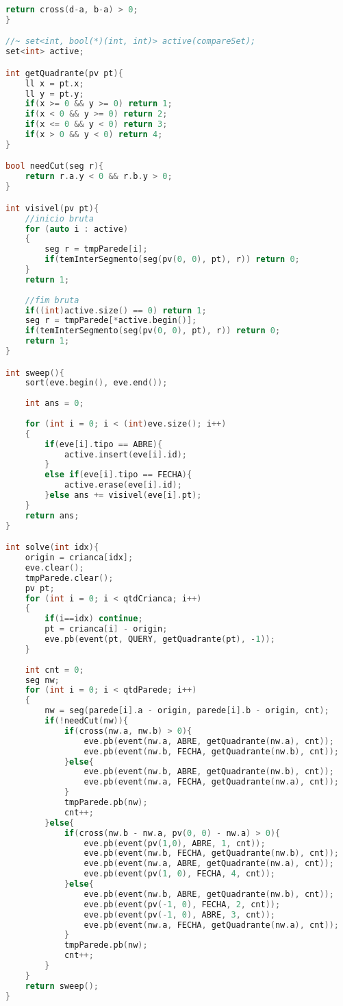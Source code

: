 \documentclass[12pt,a4paper, twoside]{report}
\begin{document}
\begin{lstlisting}[caption=Sweep Circle (esconde-esconde),language=C++]
    return cross(d-a, b-a) > 0;
}

//~ set<int, bool(*)(int, int)> active(compareSet);
set<int> active;

int getQuadrante(pv pt){
    ll x = pt.x;
    ll y = pt.y;
    if(x >= 0 && y >= 0) return 1;
    if(x < 0 && y >= 0) return 2;
    if(x <= 0 && y < 0) return 3;
    if(x > 0 && y < 0) return 4;
}

bool needCut(seg r){
    return r.a.y < 0 && r.b.y > 0;
}

int visivel(pv pt){
    //inicio bruta
    for (auto i : active)
    {
        seg r = tmpParede[i];
        if(temInterSegmento(seg(pv(0, 0), pt), r)) return 0;
    }
    return 1;
    
    //fim bruta
    if((int)active.size() == 0) return 1;
    seg r = tmpParede[*active.begin()];
    if(temInterSegmento(seg(pv(0, 0), pt), r)) return 0;
    return 1;
}

int sweep(){
    sort(eve.begin(), eve.end());
    
    int ans = 0;
    
    for (int i = 0; i < (int)eve.size(); i++)
    {
        if(eve[i].tipo == ABRE){
            active.insert(eve[i].id);
        }
        else if(eve[i].tipo == FECHA){
            active.erase(eve[i].id);
        }else ans += visivel(eve[i].pt);
    }
    return ans;
}

int solve(int idx){
    origin = crianca[idx];
    eve.clear();
    tmpParede.clear();
    pv pt;
    for (int i = 0; i < qtdCrianca; i++)
    {
        if(i==idx) continue;
        pt = crianca[i] - origin;
        eve.pb(event(pt, QUERY, getQuadrante(pt), -1));
    }
    
    int cnt = 0;
    seg nw;
    for (int i = 0; i < qtdParede; i++)
    {
        nw = seg(parede[i].a - origin, parede[i].b - origin, cnt);
        if(!needCut(nw)){
            if(cross(nw.a, nw.b) > 0){
                eve.pb(event(nw.a, ABRE, getQuadrante(nw.a), cnt));
                eve.pb(event(nw.b, FECHA, getQuadrante(nw.b), cnt));
            }else{
                eve.pb(event(nw.b, ABRE, getQuadrante(nw.b), cnt));
                eve.pb(event(nw.a, FECHA, getQuadrante(nw.a), cnt));
            }
            tmpParede.pb(nw);
            cnt++;
        }else{
            if(cross(nw.b - nw.a, pv(0, 0) - nw.a) > 0){
                eve.pb(event(pv(1,0), ABRE, 1, cnt));
                eve.pb(event(nw.b, FECHA, getQuadrante(nw.b), cnt));
                eve.pb(event(nw.a, ABRE, getQuadrante(nw.a), cnt));
                eve.pb(event(pv(1, 0), FECHA, 4, cnt));
            }else{
                eve.pb(event(nw.b, ABRE, getQuadrante(nw.b), cnt));
                eve.pb(event(pv(-1, 0), FECHA, 2, cnt));
                eve.pb(event(pv(-1, 0), ABRE, 3, cnt));
                eve.pb(event(nw.a, FECHA, getQuadrante(nw.a), cnt));
            }
            tmpParede.pb(nw);
            cnt++;
        }
    }
    return sweep();
}


\end{lstlisting}
\end{document}
